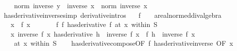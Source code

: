\begin{isabellebody}
\ \ \ \ norm\ {\isacharparenleft}{\kern0pt}inverse\ y\ {\isacharminus}{\kern0pt}\ inverse\ x{\isacharparenright}{\kern0pt}\ {\isacharasterisk}{\kern0pt}\ norm\ {\isacharparenleft}{\kern0pt}inverse\ x{\isacharparenright}{\kern0pt}{\isachardoublequoteclose}\ \isacommand{{\isachardot}{\kern0pt}}\isamarkupfalse%
\isanewline
{}\isamarkupfalse%
%
\endisatagproof
{\isafoldproof}%
%
\isadelimproof
\isanewline
%
\endisadelimproof
\isanewline
{}\isamarkupfalse%
\ has{\isacharunderscore}{\kern0pt}derivative{\isacharunderscore}{\kern0pt}inverse{\isacharbrackleft}{\kern0pt}simp{\isacharcomma}{\kern0pt}\ derivative{\isacharunderscore}{\kern0pt}intros{\isacharbrackright}{\kern0pt}{\isacharcolon}{\kern0pt}\isanewline
\ \ \ f\ {\isacharcolon}{\kern0pt}{\isacharcolon}{\kern0pt}\ {\isachardoublequoteopen}{\isacharunderscore}{\kern0pt}\ {\isasymRightarrow}\ {\isacharprime}{\kern0pt}a{\isacharcolon}{\kern0pt}{\isacharcolon}{\kern0pt}real{\isacharunderscore}{\kern0pt}normed{\isacharunderscore}{\kern0pt}div{\isacharunderscore}{\kern0pt}algebra{\isachardoublequoteclose}\isanewline
\ \ \ x{\isacharcolon}{\kern0pt}\ \ {\isachardoublequoteopen}f\ x\ {\isasymnoteq}\ {}{\isachardoublequoteclose}\isanewline
\ \ \ \ \ f{\isacharcolon}{\kern0pt}\ {\isachardoublequoteopen}{\isacharparenleft}{\kern0pt}f\ has{\isacharunderscore}{\kern0pt}derivative\ f{\isacharprime}{\kern0pt}{\isacharparenright}{\kern0pt}\ {\isacharparenleft}{\kern0pt}at\ x\ within\ S{\isacharparenright}{\kern0pt}{\isachardoublequoteclose}\isanewline
\ \ \ {\isachardoublequoteopen}{\isacharparenleft}{\kern0pt}{\isacharparenleft}{\kern0pt}{\isasymlambda}x{\isachardot}{\kern0pt}\ inverse\ {\isacharparenleft}{\kern0pt}f\ x{\isacharparenright}{\kern0pt}{\isacharparenright}{\kern0pt}\ has{\isacharunderscore}{\kern0pt}derivative\ {\isacharparenleft}{\kern0pt}{\isasymlambda}h{\isachardot}{\kern0pt}\ {\isacharminus}{\kern0pt}\ {\isacharparenleft}{\kern0pt}inverse\ {\isacharparenleft}{\kern0pt}f\ x{\isacharparenright}{\kern0pt}\ {\isacharasterisk}{\kern0pt}\ f{\isacharprime}{\kern0pt}\ h\ {\isacharasterisk}{\kern0pt}\ inverse\ {\isacharparenleft}{\kern0pt}f\ x{\isacharparenright}{\kern0pt}{\isacharparenright}{\kern0pt}{\isacharparenright}{\kern0pt}{\isacharparenright}{\kern0pt}\isanewline
\ \ \ \ {\isacharparenleft}{\kern0pt}at\ x\ within\ S{\isacharparenright}{\kern0pt}{\isachardoublequoteclose}\isanewline
%
\isadelimproof
\ \ %
\endisadelimproof
%
\isatagproof
{}\isamarkupfalse%
\ has{\isacharunderscore}{\kern0pt}derivative{\isacharunderscore}{\kern0pt}compose{\isacharbrackleft}{\kern0pt}OF\ f\ has{\isacharunderscore}{\kern0pt}derivative{\isacharunderscore}{\kern0pt}inverse{\isacharprime}{\kern0pt}{\isacharcomma}{\kern0pt}\ OF\ x{\isacharbrackright}{\kern0pt}\ \isacommand{{\isachardot}{\kern0pt}}\isamarkupfalse%

\end{isabellebody}
